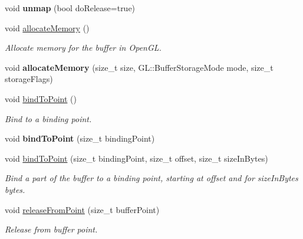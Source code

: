 \begin{Indent}
\begin{DoxyCompactItemize}
void {\bfseries unmap} (bool do\+Release=true)
\item 
\mbox{\label{classrev_1_1_g_l_buffer_af6defcf631824ff5d0cbbe6878387192}} 
void \mbox{\hyperlink{classrev_1_1_g_l_buffer_af6defcf631824ff5d0cbbe6878387192}{allocate\+Memory}} ()
\begin{DoxyCompactList}\small\item\em Allocate memory for the buffer in Open\+GL. \end{DoxyCompactList}\item 
\mbox{\label{classrev_1_1_g_l_buffer_a84bfd38ab666c1c75a0981b1bcd24a95}} 
void {\bfseries allocate\+Memory} (size\+\_\+t size, G\+L\+::\+Buffer\+Storage\+Mode mode, size\+\_\+t storage\+Flags)
\item 
\mbox{\label{classrev_1_1_g_l_buffer_a7d5ea7a4287879bab7585e59e5941106}} 
void \mbox{\hyperlink{classrev_1_1_g_l_buffer_a7d5ea7a4287879bab7585e59e5941106}{bind\+To\+Point}} ()
\begin{DoxyCompactList}\small\item\em Bind to a binding point. \end{DoxyCompactList}\item 
\mbox{\label{classrev_1_1_g_l_buffer_a9f8b200955eaad82ecd4f1ca6d02f10e}} 
void {\bfseries bind\+To\+Point} (size\+\_\+t binding\+Point)
\item 
\mbox{\label{classrev_1_1_g_l_buffer_a6b37f4a960d6aefe8219347a2ea23837}} 
void \mbox{\hyperlink{classrev_1_1_g_l_buffer_a6b37f4a960d6aefe8219347a2ea23837}{bind\+To\+Point}} (size\+\_\+t binding\+Point, size\+\_\+t offset, size\+\_\+t size\+In\+Bytes)
\begin{DoxyCompactList}\small\item\em Bind a part of the buffer to a binding point, starting at offset and for size\+In\+Bytes bytes. \end{DoxyCompactList}\item 
\mbox{\label{classrev_1_1_g_l_buffer_a05bbcbc67a152da0953dfb6fd6fad291}} 
void \mbox{\hyperlink{classrev_1_1_g_l_buffer_a05bbcbc67a152da0953dfb6fd6fad291}{release\+From\+Point}} (size\+\_\+t buffer\+Point)
\begin{DoxyCompactList}\small\item\em Release from buffer point. \end{DoxyCompactList}\item 

\end{DoxyCompactItemize}
\end{Indent}
